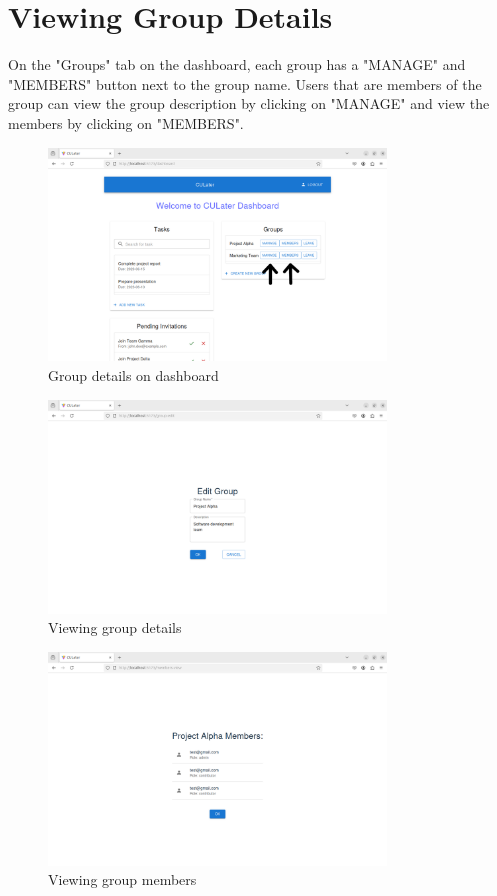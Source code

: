 \documentclass{scrreprt}
\begin{document}
\chapter{Viewing Group Details}

On the "Groups" tab on the dashboard, each group has a "MANAGE" and "MEMBERS" button next to the group name. Users that are members of the group can view the group description by clicking on "MANAGE" and view the members by clicking on "MEMBERS".\\
\begin{figure}[htbp]
        \centering
        \includegraphics[width=0.8\textwidth]{group_details.png}
	\caption{Group details on dashboard}
	\label{fig:my_label}
\end{figure}
\begin{figure}[htbp]
        \centering
        \includegraphics[width=0.8\textwidth]{group_update.png}
	\caption{Viewing group details}
	\label{fig:my_label}
\end{figure}
\begin{figure}[htbp]
        \centering
        \includegraphics[width=0.8\textwidth]{show_members.png}
	\caption{Viewing group members}
	\label{fig:my_label}
\end{figure}
\end{document}
